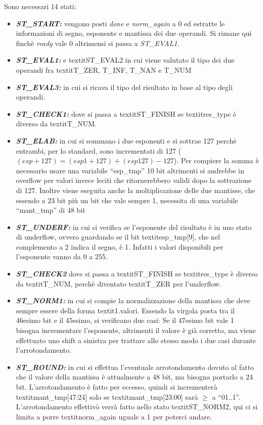 \documentclass[]{IEEEtran}
\begin{document}
Sono  necessari 14 stati:
\begin{itemize}
    \item {\it\bf ST\_START:} vengono posti \textit{done} e \textit{norm\_again} a 0 ed estratte le informazioni di segno, esponente e mantissa dei due operandi. Si rimane qui finchè \textit{ready} vale 0 altrimensi si passa a \textit{ST\_EVAL1}.
    \item {\it\bf ST\_EVAL1:} e textit{ST\_EVAL2} in cui viene valutato il tipo dei due operandi fra textit{T\_ZER, T\_INF, T\_NAN e T\_NUM}
    \item {\it\bf ST\_EVAL3:} in cui si ricava il tipo del risultato in base al tipo degli operandi.
    \item {\it\bf ST\_CHECK1:} dove si passa a textit{ST\_FINISH} se textit{res\_type} è diverso da textit{T\_NUM}.
    \item {\it\bf ST\_ELAB:} in cui si sommano i due esponenti e si sottrae 127 perchè entrambi, per lo standard, sono incrementati di 127 (\((esp+127) = (esp1+127)+(esp127) - 127\)). Per compiere la somma è necessario usare una variabile ``esp\_tmp'' 10 bit altrimenti si andrebbe in overflow per valori invece leciti che ritornerebbero validi dopo la sottrazione di 127. Inoltre viene eseguita anche la moltiplicazione delle due mantisse, che essendo a 23 bit più un bit che vale sempre 1, necessita di una variabile ``mant\_tmp'' di 48 bit
    \item {\it\bf ST\_UNDERF:} in cui si verifica se l'esponente del risultato è in uno stato di underflow, ovvero guardando se il bit textit{esp\_tmp[9]}, che nel complemento a 2 indica il segno, è 1. Infatti i valori disponibili per l'esponente vanno da 0 a 255.
    \item {\it\bf ST\_CHECK2} dove si passa a textit{ST\_FINISH} se textit{res\_type} è diverso da textit{T\_NUM}, perchè diventato textit{T\_ZER} per l'underflow.
    \item {\it\bf ST\_NORM1:} in cui si compie la normalizzazione della mantissa che deve sempre essere della forma textit{1.valori}. Essendo la virgola posta tra il 46esimo bit e il 45esimo, si verificano due casi: Se il 47esimo bit vale 1 bisogna incrementare l'esponente, altrimenti il valore è già corretto, ma viene effettuato uno shift a sinistra per trattare allo stesso modo i due casi durante l'arrotondamento.
    \item {\it\bf ST\_ROUND:} in cui si effettua l'eventuale arrotondamento dovuto al fatto che il valore della mantissa è attualmente a 48 bit, ma bisogna portarlo a 24 bit. L'arrotondamento è fatto per eccesso, quindi si incrementerà textit{mant\_tmp[47:24]} solo se textit{mant\_tmp[23:00]} sarà \( \geq \) a ``01..1''. L'arrotondamento effettivò verrà fatto nello stato textit{ST\_NORM2}, qui ci si limita a porre textit{norm\_again} uguale a 1 per poterci andare.

\end{itemize}
\end{document}
